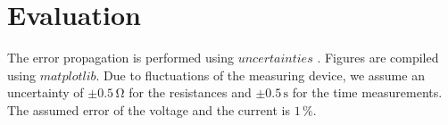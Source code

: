 \section{Evaluation}
\label{sec:Auswertung}



The error propagation is performed using $uncertainties$ \cite{unp}.
Figures are compiled using $matplotlib$\cite{Hunter:2007}. Due to fluctuations of the measuring device, we assume an uncertainty of
$\pm 0.5 \, \unit{\ohm}$ for the resistances and $\pm 0.5 \, \unit{\second} $ for the time measurements. 
The assumed error of the voltage and the current is $1 \, \%$.
